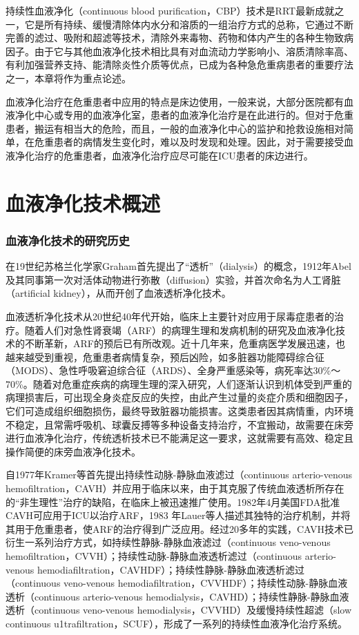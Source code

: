 持续性血液净化（continuous blood
purification，CBP）技术是RRT最新成就之一，它是所有持续、缓慢清除体内水分和溶质的一组治疗方式的总称，它通过不断完善的滤过、吸附和超滤等技术，清除外来毒物、药物和体内产生的各种生物致病因子。由于它与其他血液净化技术相比具有对血流动力学影响小、溶质清除率高、有利加强营养支持、能清除炎性介质等优点，已成为各种急危重病患者的重要疗法之一，本章将作为重点论述。

血液净化治疗在危重患者中应用的特点是床边使用，一般来说，大部分医院都有血液净化中心或专用的血液净化室，患者的血液净化治疗是在此进行的。但对于危重患者，搬运有相当大的危险，而且，一般的血液净化中心的监护和抢救设施相对简单，在危重患者的病情发生变化时，难以及时发现和处理。因此，对于需要接受血液净化治疗的危重患者，血液净化治疗应尽可能在ICU患者的床边进行。

\section{血液净化技术概述}

\subsubsection{血液净化技术的研究历史}

在19世纪苏格兰化学家Graham首先提出了“透析”（dialysis）的概念，1912年Abel及其同事第一次对活体动物进行弥散（diffusion）实验，并首次命名为人工肾脏（artificial
kidney），从而开创了血液透析净化技术。

血液透析净化技术从20世纪40年代开始，临床上主要针对应用于尿毒症患者的治疗。随着人们对急性肾衰竭（ARF）的病理生理和发病机制的研究及血液净化技术的不断革新，ARF的预后已有所改观。近十几年来，危重病医学发展迅速，也越来越受到重视，危重患者病情复杂，预后凶险，如多脏器功能障碍综合征（MODS）、急性呼吸窘迫综合征（ARDS）、全身严重感染等，病死率达30\%～70\%。随着对危重症疾病的病理生理的深入研究，人们逐渐认识到机体受到严重的病理损害后，可出现全身炎症反应的失控，由此产生过量的炎症介质和细胞因子，它们可造成组织细胞损伤，最终导致脏器功能损害。这类患者因其病情重，内环境不稳定，且常需呼吸机、球囊反搏等多种设备支持治疗，不宜搬动，故需要在床旁进行血液净化治疗，传统透析技术已不能满足这一要求，这就需要有高效、稳定且操作简便的床旁血液净化技术。

自1977年Kramer等首先提出持续性动脉-静脉血液滤过（continuous
arterio-venous
hemofiltration，CAVH）并应用于临床以来，由于其克服了传统血液透析所存在的“非生理性”治疗的缺陷，在临床上被迅速推广使用。1982年4月美国FDA批准CAVH可应用于ICU以治疗ARF，1983
年Lauer等人描述其独特的治疗机制，并将其用于危重患者，使ARF的治疗得到广泛应用。经过20多年的实践，CAVH技术已衍生一系列治疗方式，如持续性静脉-静脉血液滤过（continuous
veno-venous
hemofiltration，CVVH）；持续性动脉-静脉血液透析滤过（continuous
arterio-venous
hemodiafiltration，CAVHDF）；持续性静脉-静脉血液透析滤过（continuous
veno-venous
hemodiafiltration，CVVHDF）；持续性动脉-静脉血液透析（continuous
arterio-venous
hemodialysis，CAVHD）；持续性静脉-静脉血液透析（continuous veno-venous
hemodialysis，CVVHD）及缓慢持续性超滤（slow continuous
u1trafiltration，SCUF），形成了一系列的持续性血液净化治疗系统。

